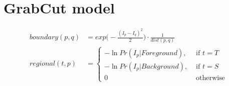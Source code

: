 \chapter{GrabCut model}
\label{app:grabcut-model}

\begin{align*}
	boundary(p,q) &= {exp\Big( -\frac{(I_p-I_q)^2}{2}} \Big) \cdot \frac{1}{dist(p,q)} \\
	regional(t,p) &= \left\{ \begin{array}{cc}
		-\ln Pr(I_p|Foreground), & \text{ if } t=T \\
		-\ln Pr(I_p|Background), & \text{ if } t=S \\		
		0 & \text{ otherwise }		
	\end{array}\right.
\end{align*}